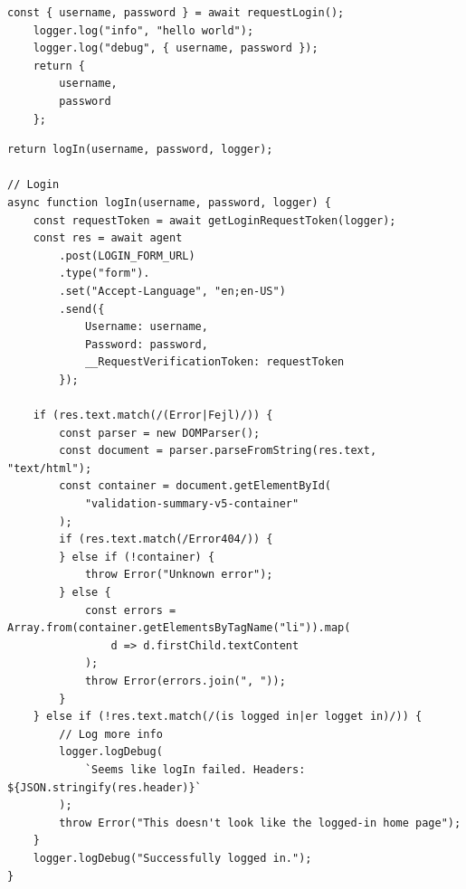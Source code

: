 \documentclass[jou,apacite]{apa6}
\begin{document}
\begin{lstlisting}[caption=Comparison 11a - Template connect against rejsekort.js's logIn Method]
	const { username, password } = await requestLogin();
	logger.log("info", "hello world");
	logger.log("debug", { username, password });
	return {
		username,
		password
	};

\end{lstlisting}

\begin{lstlisting}[caption=Comparison 11b - Template connect against rejsekort.js's logIn Method]
	return logIn(username, password, logger);

// Login
async function logIn(username, password, logger) {
	const requestToken = await getLoginRequestToken(logger);
	const res = await agent
		.post(LOGIN_FORM_URL)
		.type("form").
		.set("Accept-Language", "en;en-US")
		.send({
			Username: username,
			Password: password,
			__RequestVerificationToken: requestToken
		});

	if (res.text.match(/(Error|Fejl)/)) {
		const parser = new DOMParser();
		const document = parser.parseFromString(res.text, "text/html");
		const container = document.getElementById(
			"validation-summary-v5-container"
		);
		if (res.text.match(/Error404/)) {
		} else if (!container) {
			throw Error("Unknown error");
		} else {
			const errors = Array.from(container.getElementsByTagName("li")).map(
				d => d.firstChild.textContent
			);
			throw Error(errors.join(", "));
		}
	} else if (!res.text.match(/(is logged in|er logget in)/)) {
		// Log more info
		logger.logDebug(
			`Seems like logIn failed. Headers: ${JSON.stringify(res.header)}`
		);
		throw Error("This doesn't look like the logged-in home page");
	}
	logger.logDebug("Successfully logged in.");
}
\end{lstlisting}
\end{document}
